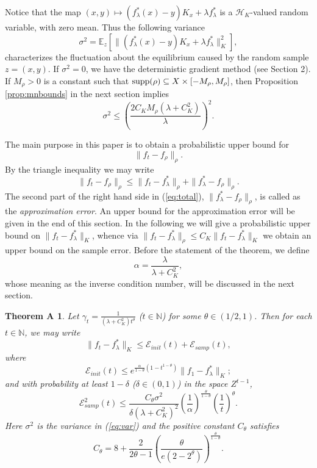 \documentclass[twoside]{amsart}
\theoremstyle{theorem}
\newtheorem*{thma}{Theorem A}
\theoremstyle{definition}
\theoremstyle{remark}
\def\H{{\mathscr H}}
\def\Err{{\mathscr E}}
\def\N{{\mathbb N}}
\def\supp{{\rm supp}}
\newcommand{\DS}{\displaystyle}
\def\E{{\mathbb E}}        %
\begin{document}
Notice that the map $(x,y)\mapsto (f^\ast_\lambda(x)-y)K_x + \lambda f^\ast_\lambda$ is a $\H_K$-valued
random variable, with zero mean. Thus the following variance
\begin{equation} \label{eq:var}
\sigma^2=\E_z [ \|( f^\ast_\lambda(x)-y) K_{x} +\lambda f^\ast_\lambda\|_K^2 ],
\end{equation}
characterizes the fluctuation about the equilibrium caused by the
random sample $z=(x,y)$. If $\sigma^2=0$, we have the
deterministic gradient method (see Section 2). If $M_\rho>0$ is a
constant such that $\supp (\rho) \subseteq X\times
[-M_\rho,M_\rho]$, then Proposition \ref{prop:mnbounds} in the
next section implies
\[ \sigma^2 \leq \left(\frac{2C_K M_\rho (\lambda+C^2_K)}{\lambda} \right)^2. \]


The main purpose in this paper is to obtain a probabilistic upper bound for
\[ \| f_t - f_\rho \|_{\rho}. \]
By the triangle inequality we may write
\begin{equation} \label{eq:total}
\| f_t - f_\rho \|_{\rho} \leq  \| f_t - f^\ast_\lambda \|_{\rho} + \| f^\ast_\lambda - f_\rho \|_{\rho}.
\end{equation}
The second part of the right hand side in (\ref{eq:total}),
$\|f^\ast_\lambda- f_\rho\|_{\rho}$, is called as the
\emph{approximation error}. An upper bound for the approximation error will be given in the
end of this section. In the following we will give a probabilistic
upper bound on $\|f_t - f^\ast_\lambda\|_K$, whence via $\|f_t - f^\ast_\lambda\|_\rho \leq C_K \|f_t - f^\ast_\lambda\|_K$ we obtain
an upper bound on the sample error. Before the statement of the theorem, we define
\begin{equation}
\alpha=\frac{\lambda}{\lambda+C^2_K},
\end{equation}
whose meaning as the inverse condition number, will be discussed
in the next section.


\begin{thma}\label{thm:rkhs} Let $\DS \gamma_t = \frac{1}{(\lambda+C_K^2)t^\theta}$ ($t\in \N$) for some $\theta \in (1/2,1)$.
Then for each $t\in \N$, we may write
\begin{equation} \label{eq:intsam}
\|f_t - f^\ast_\lambda\|_K \leq \Err_{init}(t) + \Err_{samp}(t),
\end{equation}
where
\[ \Err_{init}(t) \leq e^{\frac{\alpha}{1-\theta}(1-t^{1-\theta})} \|f_1 - f^\ast_\lambda\|_K; \]
and with probability at least $1-\delta$ ($\delta \in (0,1)$) in the space $Z^{t-1}$,
\[ \Err_{samp}^2(t)\leq \frac{C_\theta \sigma^2 }{\delta(\lambda+C^2_K)^2}
 \left(\frac{1}{\alpha} \right)^{\frac{\theta}{1-\theta}}
\left(\frac{1}{t}\right)^{\theta}. \]
Here $\sigma^2$ is the variance in (\ref{eq:var}) and the positive constant $C_\theta$ satisfies
\[ C_\theta = 8 + \frac{2}{2\theta-1} \left(\frac{\theta}{e(2-2^\theta)}
\right)^{\frac{\theta}{1-\theta}}  . \]
\end{thma}
\end{document}
